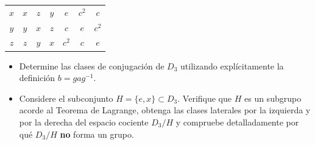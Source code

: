 \documentclass[11pt, a4paper]{article}
\begin{document}
\begin{enumerate}
\begin{center}
\begin{tabular}{c|cccccc}
    $x$ & $x$ & $z$ & $y$ & $e$ & $c^2$ & $c$ \\
    $y$ & $y$ & $x$ & $z$ & $c$ & $e$ & $c^2$ \\
    $z$ & $z$ & $y$ & $x$ & $c^2$ & $c$ & $e$
    \end{tabular}
    \end{center}
    \begin{itemize}
        \item Determine las clases de conjugación de $D_3$ utilizando explícitamente la definición $b = gag^{-1}$.
        \item Considere el subconjunto $H = \{e, x\} \subset D_3$. Verifique que $H$ es un subgrupo acorde al Teorema de Lagrange, obtenga las clases laterales por la izquierda y por la derecha del espacio cociente $D_3/H$ y compruebe detalladamente por qué $D_3/H$ \textbf{no} forma un grupo.
    \end{itemize}
\end{enumerate}
\end{document}
